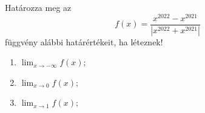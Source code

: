 \documentclass[11pt]{scrartcl}
\begin{document}
Határozza meg az
\[
	f(x) = \frac{x^{2022} - x^{2021}}{\left| x^{2022} + x^{2021} \right|}
\]
függvény alábbi határértékeit, ha léteznek!
\begin{enumerate}
	\item \(\displaystyle \lim_{x \to -\infty} f(x);\)

	\item \(\displaystyle \lim_{x \to 0} f(x);\)

	\item \(\displaystyle \lim_{x \to 1} f(x);\)
\end{enumerate}
\end{document}
